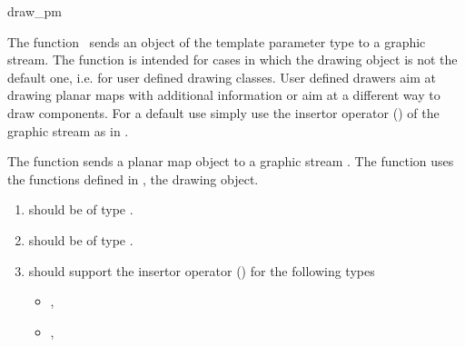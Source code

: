 
\ccRefPageBegin


\begin{ccRefFunction}{draw_pm}


\ccDefinition
The function \ccRefName\ sends an object of the template parameter
type  to a graphic stream. The function is intended
for cases in which the drawing object is not the default one, i.e. for
user defined drawing classes. User defined drawers aim at drawing
planar maps with additional information or aim at a different way to
draw components. For a default use simply use the insertor operator
(\ccc{<<}) of the graphic stream as in .


           {The function sends a planar map object to a graphic stream
           . The function uses the functions defined in
           , the drawing object.}

\begin{enumerate}
   \item    {}  
            should be of type .
   \item    {}  
            should be of type .
   \item    {} should support the insertor operator (\ccc{<<}) 
            for the following types
            \begin{itemize}
                \item {},
                \item {}, 
            \end{itemize}
\end{enumerate}

\ccSeeAlso
     \\

\end{ccRefFunction} %

\ccRefPageEnd





